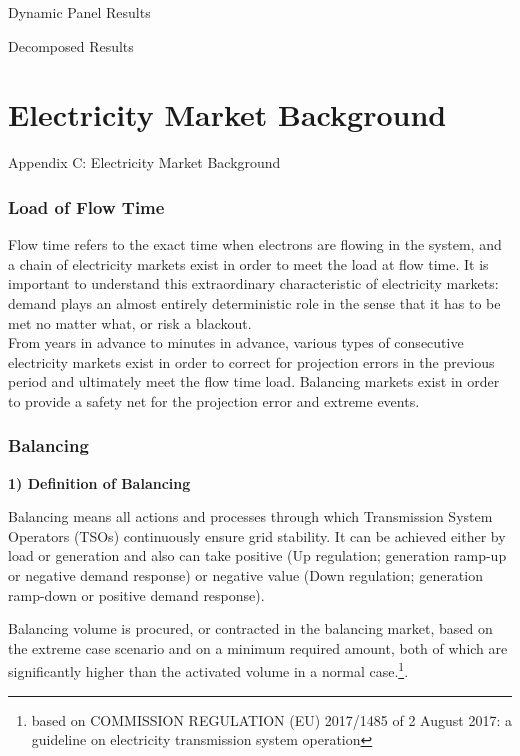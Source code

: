 \documentclass[12pt]{article}
\begin{document}
\begin{appendix}
\begin{table}[!htbp] \centering
  
  \caption{Dynamic Panel Results}
  \label{table:DynamicPanel}
\end{table}

\begin{table}[!htbp] \centering 
  
  \caption{Decomposed Results}
  \label{table:Decomposed}
\end{table}


\FloatBarrier
\section{Electricity Market Background}
\label{appenidx:Background}
\caption{Appendix C: Electricity Market Background}

\subsubsection*{Load of Flow Time}\par
Flow time refers to the exact time when electrons are flowing in the system, and a chain of electricity markets exist in order to meet the load at flow time. It is important to understand this extraordinary characteristic of electricity markets: demand plays an almost entirely deterministic role in the sense that it has to be met no matter what, or risk a blackout.\\
From years in advance to minutes in advance, various types of consecutive electricity markets exist in order to correct for projection errors in the previous period and ultimately meet the flow time load. Balancing markets exist in order to provide a safety net for the projection error and extreme events.

\subsubsection*{Balancing}\par
\textbf{1) Definition of Balancing}\par
Balancing means all actions and processes through which Transmission System Operators (TSOs) continuously ensure grid stability. It can be achieved either by load or generation and also can take positive (Up regulation; generation ramp-up or negative demand response) or negative value (Down regulation; generation ramp-down or positive demand response).\par

Balancing volume is procured, or contracted in the balancing market, based on the extreme case scenario and on a minimum required amount, both of which are significantly higher than the activated volume in a normal case.\footnote{based on COMMISSION REGULATION (EU) 2017/1485
of 2 August 2017: a guideline on electricity transmission system operation}.


\end{appendix}
\end{document}
